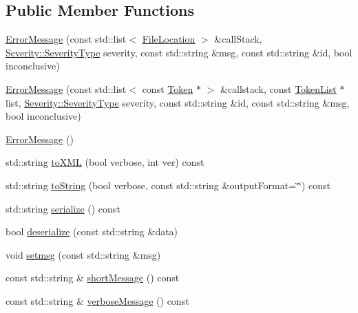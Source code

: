 \subsection*{Public Member Functions}
\begin{DoxyCompactItemize}
\item 
\hyperlink{class_error_logger_1_1_error_message_a28b4ef630be617e7c635781892e08a9d}{Error\-Message} (const std\-::list$<$ \hyperlink{class_error_logger_1_1_error_message_1_1_file_location}{File\-Location} $>$ \&call\-Stack, \hyperlink{class_severity_ac185938ae084355bbf1790cf1a70caa6}{Severity\-::\-Severity\-Type} severity, const std\-::string \&msg, const std\-::string \&id, bool inconclusive)
\item 
\hyperlink{class_error_logger_1_1_error_message_a97ebcfa70a2ea466f894467419729830}{Error\-Message} (const std\-::list$<$ const \hyperlink{class_token}{Token} $\ast$ $>$ \&callstack, const \hyperlink{class_token_list}{Token\-List} $\ast$list, \hyperlink{class_severity_ac185938ae084355bbf1790cf1a70caa6}{Severity\-::\-Severity\-Type} severity, const std\-::string \&id, const std\-::string \&msg, bool inconclusive)
\item 
\hyperlink{class_error_logger_1_1_error_message_a6ff22717895a17e9b15fa2ed13dcb5a4}{Error\-Message} ()
\item 
std\-::string \hyperlink{class_error_logger_1_1_error_message_af9ffad6052651d748fed78cff18966bf}{to\-X\-M\-L} (bool verbose, int ver) const 
\item 
std\-::string \hyperlink{class_error_logger_1_1_error_message_a83016cd949e899d011507847b2c52790}{to\-String} (bool verbose, const std\-::string \&output\-Format=\char`\"{}\char`\"{}) const 
\item 
std\-::string \hyperlink{class_error_logger_1_1_error_message_a24cb003899ee92c3444730c0dc5f0de1}{serialize} () const 
\item 
bool \hyperlink{class_error_logger_1_1_error_message_a6676fb449879ff7948c84befbff78c6a}{deserialize} (const std\-::string \&data)
\item 
void \hyperlink{class_error_logger_1_1_error_message_a9e07d0c392487d3620a510b88ef2c739}{setmsg} (const std\-::string \&msg)
\item 
const std\-::string \& \hyperlink{class_error_logger_1_1_error_message_a29524f4eed3852fa58089218749509fd}{short\-Message} () const 
\item 
const std\-::string \& \hyperlink{class_error_logger_1_1_error_message_ac26c74c7fb147d4f2faf72a0f81803ec}{verbose\-Message} () const 
\end{DoxyCompactItemize}
